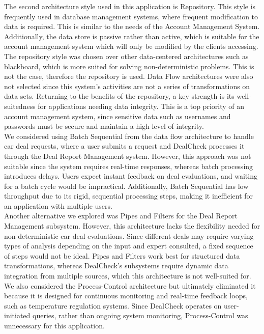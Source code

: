 \documentclass[]{article}
\begin{document}
The second architecture style used in this application is Repository. This style is frequently used in database management systems, where frequent modification to data is required. This is similar to the needs of the Account Management System. Additionally, the data store is passive rather than active, which is suitable for the account management system which will only be modified by the clients accessing. The repository style was chosen over other data-centered architectures such as blackboard, which is more suited for solving non-deterministic problems. This is not the case, therefore the repository is used. Data Flow architectures were also not selected since this system’s activities are not a series of transformations on data sets. Returning to the benefits of the repository, a key strength is its well-suitedness for applications needing data integrity. This is a top priority of an account management system, since sensitive data such as usernames and passwords must be secure and maintain a high level of integrity.\\

We considered using Batch Sequential from the data flow architecture to handle car deal requests, where a user submits a request and DealCheck processes it through the Deal Report Management system. However, this approach was not suitable since the system requires real-time responses, whereas batch processing introduces delays. Users expect instant feedback on deal evaluations, and waiting for a batch cycle would be impractical. Additionally, Batch Sequential has low throughput due to its rigid, sequential processing steps, making it inefficient for an application with multiple users.\\

Another alternative we explored was Pipes and Filters for the Deal Report Management subsystem. However, this architecture lacks the flexibility needed for non-deterministic car deal evaluations. Since different deals may require varying types of analysis depending on the input and expert consulted, a fixed sequence of steps would not be ideal. Pipes and Filters work best for structured data transformations, whereas DealCheck's subsystems require dynamic data integration from multiple sources, which this architecture is not well-suited for.\\

We also considered the Process-Control architecture but ultimately eliminated it because it is designed for continuous monitoring and real-time feedback loops, such as temperature regulation systems. Since DealCheck operates on user-initiated queries, rather than ongoing system monitoring, Process-Control was unnecessary for this application.\\
\end{document}
